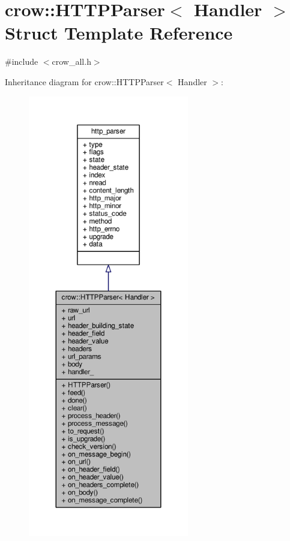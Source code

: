 \hypertarget{structcrow_1_1_h_t_t_p_parser}{\section{crow\-:\-:H\-T\-T\-P\-Parser$<$ Handler $>$ Struct Template Reference}
\label{structcrow_1_1_h_t_t_p_parser}
}


{\ttfamily \#include $<$crow\-\_\-all.\-h$>$}



Inheritance diagram for crow\-:\-:H\-T\-T\-P\-Parser$<$ Handler $>$\-:
\nopagebreak
\begin{figure}[H]
\begin{center}
\leavevmode
\includegraphics[height=550pt]{structcrow_1_1_h_t_t_p_parser__inherit__graph}
\end{center}
\end{figure}


